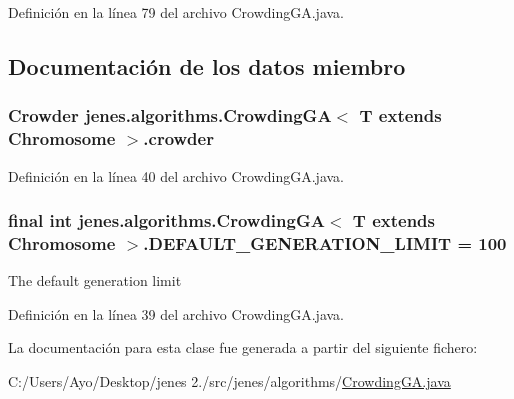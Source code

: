 Definición en la línea 79 del archivo Crowding\-G\-A.\-java.



\subsection{Documentación de los datos miembro}
\hypertarget{classjenes_1_1algorithms_1_1_crowding_g_a_3_01_t_01extends_01_chromosome_01_4_aa747112afbb20cb4faec643ccc73e396}{
\subsubsection[{crowder}]{\setlength{\rightskip}{0pt plus 5cm}Crowder jenes.\-algorithms.\-Crowding\-G\-A$<$ T extends Chromosome $>$.crowder\hspace{0.3cm}{\ttfamily [protected]}}}\label{classjenes_1_1algorithms_1_1_crowding_g_a_3_01_t_01extends_01_chromosome_01_4_aa747112afbb20cb4faec643ccc73e396}


Definición en la línea 40 del archivo Crowding\-G\-A.\-java.

\hypertarget{classjenes_1_1algorithms_1_1_crowding_g_a_3_01_t_01extends_01_chromosome_01_4_afb96c2e73129293b45044998e3614c06}{
\subsubsection[{D\-E\-F\-A\-U\-L\-T\-\_\-\-G\-E\-N\-E\-R\-A\-T\-I\-O\-N\-\_\-\-L\-I\-M\-I\-T}]{\setlength{\rightskip}{0pt plus 5cm}final int jenes.\-algorithms.\-Crowding\-G\-A$<$ T extends Chromosome $>$.D\-E\-F\-A\-U\-L\-T\-\_\-\-G\-E\-N\-E\-R\-A\-T\-I\-O\-N\-\_\-\-L\-I\-M\-I\-T = 100\hspace{0.3cm}{\ttfamily [static]}}}\label{classjenes_1_1algorithms_1_1_crowding_g_a_3_01_t_01extends_01_chromosome_01_4_afb96c2e73129293b45044998e3614c06}
The default generation limit 

Definición en la línea 39 del archivo Crowding\-G\-A.\-java.



La documentación para esta clase fue generada a partir del siguiente fichero\-:\begin{DoxyCompactItemize}
\item 
C\-:/\-Users/\-Ayo/\-Desktop/jenes 2./src/jenes/algorithms/\hyperlink{_crowding_g_a_8java}{Crowding\-G\-A.\-java}\end{DoxyCompactItemize}
